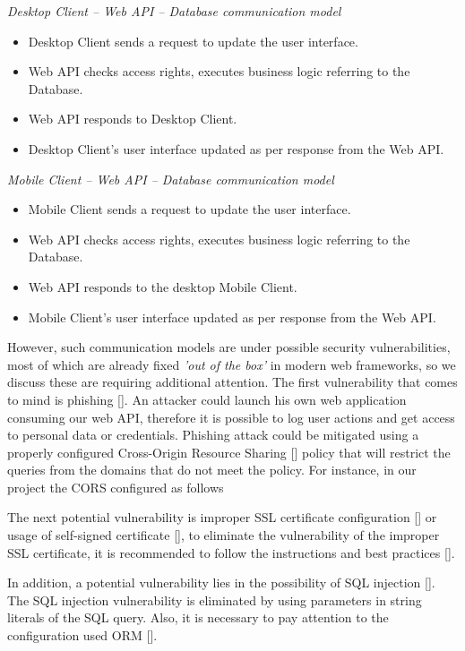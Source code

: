 \textit{Desktop Client -- Web API -- Database communication model}
\begin{itemize}
    \item Desktop Client sends a request to update the user interface.
    \item Web API checks access rights, executes business logic referring to the Database.
    \item Web API responds to Desktop Client.
    \item Desktop Client's user interface updated as per response from the Web API\@.
\end{itemize}

\textit{Mobile Client -- Web API -- Database communication model}
\begin{itemize}
    \item Mobile Client sends a request to update the user interface.
    \item Web API checks access rights, executes business logic referring to the Database.
    \item Web API responds to the desktop Mobile Client.
    \item Mobile Client's user interface updated as per response from the Web API\@.
\end{itemize}

However, such communication models are under possible security vulnerabilities, most of which are already fixed
\textit{'out of the box'} in modern web frameworks, so we discuss these are requiring additional attention.
The first vulnerability that comes to mind is phishing [\cite{dhamija2006phishing}].
An attacker could launch his own web application consuming our web API, therefore it is possible to log user actions
and get access to personal data or credentials.
Phishing attack could be mitigated using a properly configured Cross-Origin Resource Sharing [\cite{gibbinscross}]
policy that will restrict the queries from the domains that do not meet the policy.
For instance, in our project the CORS configured as follows



The next potential vulnerability is improper SSL certificate configuration [\cite{georgiev2012most, el2012most}]
or usage of self-signed certificate [\cite{kappenberger2012true}],
to eliminate the vulnerability of the improper SSL certificate, it is recommended to follow the instructions
and best practices [\cite{rapp2021web}].

In addition, a potential vulnerability lies in the possibility of SQL injection [\cite{halfond2006classification}].
The SQL injection vulnerability is eliminated by using parameters in string literals of the SQL query.
Also, it is necessary to pay attention to the configuration used ORM [\cite{tiwari2015study}].

